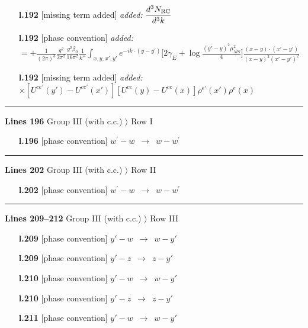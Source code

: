 \documentclass[10pt]{article}
\begin{document}
\begin{itemize}[leftmargin=2.2em,itemsep=1pt,topsep=2pt]
\item[\textbf{l.192}] \textsf{\small [missing term added]} \emph{added:} $\displaystyle \frac{d^{3}N_{\rm RC}}{d^{3}k}$
\item[\textbf{l.192}] \textsf{\small [phase convention]} \emph{added:} $\displaystyle = +\frac{1}{(2\pi)^{3}}\frac{g^{2}}{2\pi^{2}}\frac{g^{2}\beta_{0}}{16\pi^{2}}\frac{1}{k^{+}}\int_{x,y,x',y'}e^{-ik\cdot(y-y')}\Big[2\gamma_{E}+\log\frac{(y'-y)^{2}\mu^{2}_{\overline{MS}}}{4}\Big]\frac{(x-y)\cdot(x'-y')}{(x-y)^{2}(x'-y')^{2}}$
\item[\textbf{l.192}] \textsf{\small [missing term added]} \emph{added:} $\displaystyle \times[U^{ce'}(y') - U^{ce'}(x')][U^{ce}(y) - U^{ce}(x)]\rho^{e'}(x')\rho^{e}(x)$
\end{itemize}
\noindent\rule{\linewidth}{0.3pt}\par\noindent\textbf{Lines 196} \quad \textsf{Group III (with c.c.) $\rangle$ Row I} \par
\begin{itemize}[leftmargin=2.2em,itemsep=1pt,topsep=2pt]
\item[\textbf{l.196}] \textsf{\small [phase convention]} $\displaystyle w^{\prime}-w$\ $\longrightarrow$\ $\displaystyle w-w^{\prime}$
\end{itemize}
\noindent\rule{\linewidth}{0.3pt}\par\noindent\textbf{Lines 202} \quad \textsf{Group III (with c.c.) $\rangle$ Row II} \par
\begin{itemize}[leftmargin=2.2em,itemsep=1pt,topsep=2pt]
\item[\textbf{l.202}] \textsf{\small [phase convention]} $\displaystyle w^{\prime}-w$\ $\longrightarrow$\ $\displaystyle w-w^{\prime}$
\end{itemize}
\noindent\rule{\linewidth}{0.3pt}\par\noindent\textbf{Lines 209--212} \quad \textsf{Group III (with c.c.) $\rangle$ Row III} \par
\begin{itemize}[leftmargin=2.2em,itemsep=1pt,topsep=2pt]
\item[\textbf{l.209}] \textsf{\small [phase convention]} $\displaystyle y'-w$\ $\longrightarrow$\ $\displaystyle w-y'$
\item[\textbf{l.209}] \textsf{\small [phase convention]} $\displaystyle y'-z$\ $\longrightarrow$\ $\displaystyle z-y'$
\item[\textbf{l.210}] \textsf{\small [phase convention]} $\displaystyle y'-w$\ $\longrightarrow$\ $\displaystyle w-y'$
\item[\textbf{l.210}] \textsf{\small [phase convention]} $\displaystyle y'-z$\ $\longrightarrow$\ $\displaystyle z-y'$
\item[\textbf{l.211}] \textsf{\small [phase convention]} $\displaystyle y'-w$\ $\longrightarrow$\ $\displaystyle w-y'$
\end{itemize}
\end{document}
